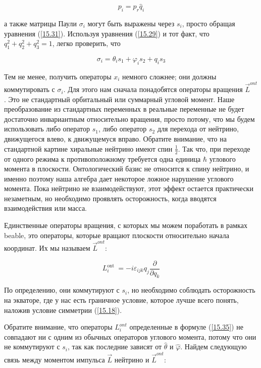 \documentclass[main.tex]{subfiles}
\begin{document}
\begin{equation}\label{15.33}
	p_i = p_r \hat q_i
\end{equation}
            
а также матрицы Паули $\sigma_i$ могут быть выражены через $s_i$, просто обращая уравнения (\ref{15.31}). Используя уравнения (\ref{15.29}) и тот факт, что $q_1^2 + q_2^2 + q_3^2 = 1$, легко проверить, что

\begin{equation}\label{15.34}
	\sigma_{i}=\theta_{i} s_{1}+\varphi_{i} s_{2}+q_{i} s_{3}
\end{equation}
         
Тем не менее, получить операторы $x_i$ немного сложнее; они должны коммутировать с $\sigma_i$. Для этого нам сначала понадобятся операторы вращения $\vec L^{ont}$. Это не стандартный орбитальный или суммарный угловой момент. Наше преобразование из стандартных переменных в реальные переменные не будет достаточно инвариантным относительно вращения, просто потому, что мы будем использовать либо оператор $s_1$, либо оператор $s_2$ для перехода от нейтрино, движущегося влево, к движущемуся вправо. Обратите внимание, что на стандартной картине хиральные нейтрино имеют спин $\frac 1 2 $. Так что, при переходе от одного режима к противоположному требуется одна единица $\hbar$ углового момента в плоскости. Онтологический базис не относится к спину нейтрино, и именно поэтому наша алгебра дает некоторое ложное нарушение углового момента. Пока нейтрино не взаимодействуют, этот эффект остается практически незаметным, но необходимо проявлять осторожность, когда вводятся взаимодействия или масса.

Единственные операторы вращения, с которых мы можем поработать в рамках beable, это операторы, которые вращают плоскости относительно начала координат. Их мы называем $\vec L^{ont}$:

\begin{equation}\label{15.35}
	L_{i}^{\text {ont }}=-i \varepsilon_{i j k} q_{j} \frac{\partial}{\partial q_{k}}
\end{equation}

По определению, они коммутируют с $s_i$, но необходимо соблюдать осторожность на экваторе, где у нас есть граничное условие, которое лучше всего понять, наложив условие симметрии (\ref{15.18}).

Обратите внимание, что операторы $L_i^{ont}$ определенные в формуле (\ref{15.35}) не совпадают ни с одним из обычных операторов углового момента, потому что они не коммутируют с $s_i$, так как последние зависят от $\hat \theta$ и $\hat \varphi$. Найдем следующую связь между моментом импульса $\vec L$ нейтрино и $\vec L^{ont}$:
\end{document}
